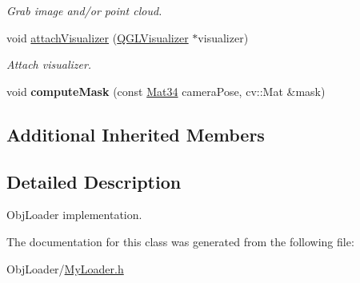 \begin{DoxyCompactItemize}
\begin{DoxyCompactList}\small\item\em Grab image and/or point cloud. \end{DoxyCompactList}\item 
void \hyperlink{classMyLoader_a6d01f2ecf0cd0167e37a55253ed3fdc2}{attach\+Visualizer} (\hyperlink{classQGLVisualizer}{Q\+G\+L\+Visualizer} $\ast$visualizer)\hypertarget{classMyLoader_a6d01f2ecf0cd0167e37a55253ed3fdc2}{}\label{classMyLoader_a6d01f2ecf0cd0167e37a55253ed3fdc2}

\begin{DoxyCompactList}\small\item\em Attach visualizer. \end{DoxyCompactList}\item 
void {\bfseries compute\+Mask} (const \hyperlink{namespaceputar_a8bf3c8025ae8f60f553a752014c9849a}{Mat34} camera\+Pose, cv\+::\+Mat \&mask)\hypertarget{classMyLoader_aefe8d1d90aa940353f8f794c4694277f}{}\label{classMyLoader_aefe8d1d90aa940353f8f794c4694277f}

\end{DoxyCompactItemize}
\subsection*{Additional Inherited Members}


\subsection{Detailed Description}
Obj\+Loader implementation. 

The documentation for this class was generated from the following file\+:\begin{DoxyCompactItemize}
\item 
Obj\+Loader/\hyperlink{MyLoader_8h}{My\+Loader.\+h}\end{DoxyCompactItemize}
